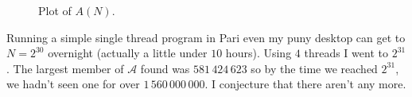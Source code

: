 \documentclass[leqno,a4paper]{article}
\begin{document}
\begin{figure}[tbp]
\centering
{}
\caption{Plot of $A(N)$.}
\end{figure}


Running a simple single thread program in Pari even my puny desktop can get to $N=2^{30}$ overnight (actually a little under $10$ hours). Using $4$ threads I went to $2^{31}$. The largest member of $\mathcal{A}$ found was $581\,424\,623$ so by the time we reached $2^{31}$, we hadn't seen one for over $1\,560\,000\,000$. I conjecture that there aren't any more.
\end{document}
